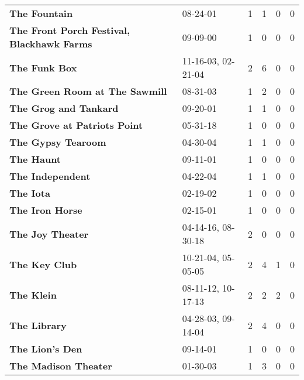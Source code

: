\begin{supertabular}{p{0.4\textwidth}p{0.3\textwidth}p{0.05\textwidth}p{0.05\textwidth}p{0.05\textwidth}p{0.05\textwidth}}
                                                \textbf{The Fountain} &            08-24-01 &  1 &  1 &  0 &  0 \\
                   \textbf{The Front Porch Festival, Blackhawk Farms} &            09-09-00 &  1 &  0 &  0 &  0 \\
                                                \textbf{The Funk Box} &  11-16-03, 02-21-04 &  2 &  6 &  0 &  0 \\
                               \textbf{The Green Room at The Sawmill} &            08-31-03 &  1 &  2 &  0 &  0 \\
                                        \textbf{The Grog and Tankard} &            09-20-01 &  1 &  1 &  0 &  0 \\
                                 \textbf{The Grove at Patriots Point} &            05-31-18 &  1 &  0 &  0 &  0 \\
                                           \textbf{The Gypsy Tearoom} &            04-30-04 &  1 &  1 &  0 &  0 \\
                                                   \textbf{The Haunt} &            09-11-01 &  1 &  0 &  0 &  0 \\
                                             \textbf{The Independent} &            04-22-04 &  1 &  1 &  0 &  0 \\
                                                    \textbf{The Iota} &            02-19-02 &  1 &  0 &  0 &  0 \\
                                              \textbf{The Iron Horse} &            02-15-01 &  1 &  0 &  0 &  0 \\
                                            \textbf{The Joy  Theater} &  04-14-16, 08-30-18 &  2 &  0 &  0 &  0 \\
                                                \textbf{The Key Club} &  10-21-04, 05-05-05 &  2 &  4 &  1 &  0 \\
                                                   \textbf{The Klein} &  08-11-12, 10-17-13 &  2 &  2 &  2 &  0 \\
                                                 \textbf{The Library} &  04-28-03, 09-14-04 &  2 &  4 &  0 &  0 \\
                                              \textbf{The Lion's Den} &            09-14-01 &  1 &  0 &  0 &  0 \\
                                         \textbf{The Madison Theater} &            01-30-03 &  1 &  3 &  0 &  0 \\

\end{supertabular}

